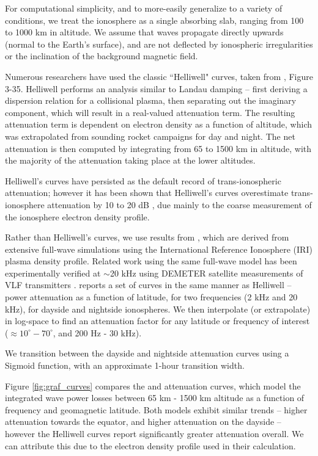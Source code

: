 For computational simplicity, and to more-easily generalize to a variety of conditions, we treat the ionosphere as a single absorbing slab, ranging from 100 to 1000 km in altitude. We assume that waves propagate directly upwards (normal to the Earth's surface), and are not deflected by ionospheric irregularities or the inclination of the background magnetic field.

Numerous researchers \citep{Lauben1998, Bortnik2005, Kulkarni2009, Graf2013} have used the classic ``Helliwell" curves, taken from \cite{Helliwell1965}, Figure 3-35. Helliwell performs an analysis similar to Landau damping -- first deriving a dispersion relation for a collisional plasma, then separating out the imaginary component, which will result in a real-valued attenuation term. The resulting attenuation term is dependent on electron density as a function of altitude, which was extrapolated from sounding rocket campaigns for day and night. The net attenuation is then computed by integrating from 65 to 1500 km in altitude, with the majority of the attenuation taking place at the lower altitudes.

Helliwell's curves have persisted as the default record of trans-ionospheric attenuation; however it has been shown that Helliwell's curves overestimate trans-ionosphere attenuation by 10 to 20 dB \citep{Starks2008}, due mainly to the coarse measurement of the ionosphere electron density profile.

Rather than Helliwell's curves, we use results from \cite{Graf2013}, which are derived from extensive full-wave simulations using the International Reference Ionosphere (IRI) plasma density profile. Related work using the same full-wave model has been experimentally verified at $\sim$20 kHz using DEMETER satellite measurements of VLF transmitters \citep{Cohen2012}. \citeauthor{Graf2013} reports a set of curves in the same manner as Helliwell -- power attenuation as a function of latitude, for two frequencies (2 kHz and 20 kHz), for dayside and nightside ionospheres. We then interpolate (or extrapolate) in log-space to find an attenuation factor for any latitude or frequency of interest ($\approx 10^\circ - 70^\circ$, and 200 Hz - 30 kHz).

We transition between the dayside and nightside attenuation curves using a Sigmoid function, with an approximate 1-hour transition width.

Figure \ref{fig:graf_curves} compares the \cite{Graf2013} and \cite{Helliwell1965} attenuation curves, which model the integrated wave power losses between 65 km - 1500 km altitude as a function of frequency and geomagnetic latitude. Both models exhibit similar trends -- higher attenuation towards the equator, and higher attenuation on the dayside -- however the Helliwell curves report significantly greater attenuation overall. We can attribute this due to the electron density profile used in their calculation.

